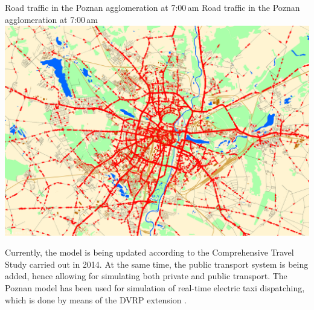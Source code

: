 \createfigure%
{Road traffic in the Poznan agglomeration at 7:00\,am}%
{Road traffic in the Poznan agglomeration at 7:00\,am}%
{\label{fig:poznan_traffic_simulation}}%
{\includegraphics[width=\textwidth, angle=0]{using/figures/poznan_traffic_simulation}}%
{}%

Currently, the model is being updated according to the Comprehensive Travel Study carried out in 2014. At the same time, the public transport system is being added, hence allowing for simulating both private and public transport. The Poznan model has been used for simulation of real-time electric taxi dispatching, which is done by means of the DVRP extension .


